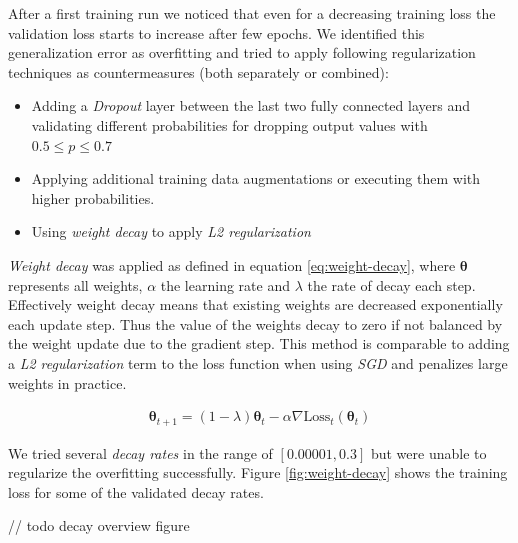 After a first training run we noticed that even for a decreasing training loss the validation loss starts to increase after few epochs. We identified this generalization error as overfitting and tried to apply following regularization techniques as countermeasures (both separately or combined):
\begin{itemize}
	\item Adding a \textit{Dropout} layer between the last two fully connected layers and validating different probabilities for dropping output values with $0.5 \leq p \leq 0.7$
	\item Applying additional training data augmentations or executing them with higher probabilities.
	\item Using \textit{weight decay} to apply \textit{L2 regularization}
\end{itemize}

\textit{Weight decay} was applied as defined in equation \ref{eq:weight-decay}, where $\boldsymbol{\theta}$ represents all weights, $\alpha$ the learning rate and $\lambda$ the rate of decay each step. Effectively weight decay means that existing weights are decreased exponentially each update step. Thus the value of the weights decay to zero if not balanced by the weight update due to the gradient step. This method is comparable to adding a \textit{L2 regularization} term to the loss function when using \textit{SGD} \autocite{loshchilov2017decoupled} and penalizes large weights in practice.

\begin{align}\label{eq:weight-decay}
	\boldsymbol{\theta}_{t+1} = \left( 1 - \lambda \right) \boldsymbol{\theta}_{t} - \alpha \nabla \text{Loss}_t \left( \boldsymbol{\theta}_{t} \right)
\end{align}

We tried several \textit{decay rates} in the range of $[0.00001, 0.3]$ but were unable to regularize the overfitting successfully. Figure \vref{fig:weight-decay} shows the training loss for some of the validated decay rates.

// todo decay overview figure

